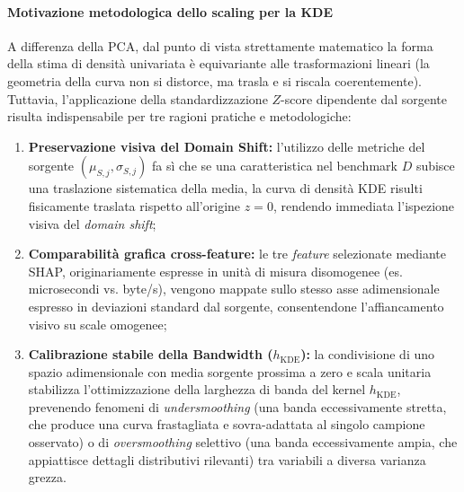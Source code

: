 \paragraph{Motivazione metodologica dello scaling per la KDE}
A differenza della PCA, dal punto di vista strettamente matematico la forma della stima di densità univariata è equivariante alle trasformazioni lineari (la geometria della curva non si distorce, ma trasla e si riscala coerentemente). Tuttavia, l'applicazione della standardizzazione $Z$-score dipendente dal sorgente risulta indispensabile per tre ragioni pratiche e metodologiche:
\begin{enumerate}
    \item \textbf{Preservazione visiva del Domain Shift:} l'utilizzo delle metriche del sorgente $(\mu_{S,j}, \sigma_{S,j})$ fa sì che se una caratteristica nel benchmark $D$ subisce una traslazione sistematica della media, la curva di densità KDE risulti fisicamente traslata rispetto all'origine $z=0$, rendendo immediata l'ispezione visiva del \textit{domain shift};
    \item \textbf{Comparabilità grafica cross-feature:} le tre \textit{feature} selezionate mediante SHAP, originariamente espresse in unità di misura disomogenee (es. microsecondi vs. byte/s), vengono mappate sullo stesso asse adimensionale espresso in deviazioni standard dal sorgente, consentendone l'affiancamento visivo su scale omogenee;
    \item \textbf{Calibrazione stabile della Bandwidth ($h_{\text{KDE}}$):} la condivisione di uno spazio adimensionale con media sorgente prossima a zero e scala unitaria stabilizza l'ottimizzazione della larghezza di banda del kernel $h_{\text{KDE}}$, prevenendo fenomeni di \textit{undersmoothing} (una banda eccessivamente stretta, che produce una curva frastagliata e sovra-adattata al singolo campione osservato) o di \textit{oversmoothing} selettivo (una banda eccessivamente ampia, che appiattisce dettagli distributivi rilevanti) tra variabili a diversa varianza grezza.
\end{enumerate}

